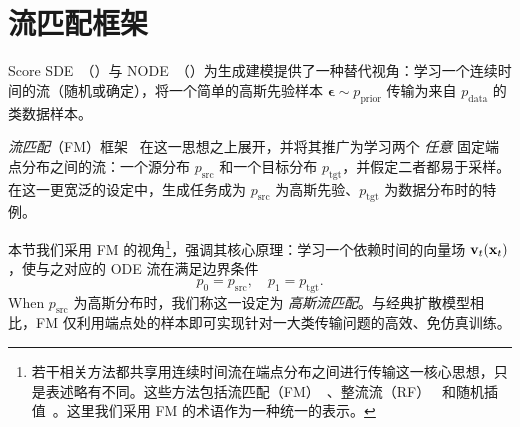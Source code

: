 




\newpage
\clearpage
\section{\texorpdfstring{流匹配框架}{Flow Matching Framework}}\label{sec:flow-matching-framework}

Score SDE~（）与 NODE~（）为生成建模提供了一种替代视角：学习一个连续时间的流（随机或确定），将一个简单的高斯先验样本 $\bm{\epsilon} \sim p_{\text{prior}}$ 传输为来自 $p_{\text{data}}$ 的类数据样本。

\emph{流匹配}（FM）框架~\citep{lipman2022flow,lipman2024flow,tongimproving} 在这一思想之上展开，并将其推广为学习两个 \emph{任意} 固定端点分布之间的流：一个源分布 $p_{\text{src}}$ 和一个目标分布 $p_{\text{tgt}}$，并假定二者都易于采样。在这一更宽泛的设定中，生成任务成为 $p_{\text{src}}$ 为高斯先验、$p_{\text{tgt}}$ 为数据分布时的特例。

本节我们采用 FM 的视角\footnote{若干相关方法都共享用连续时间流在端点分布之间进行传输这一核心思想，只是表述略有不同。这些方法包括流匹配（FM）~\citep{lipman2022flow,neklyudov2023action}、整流流（RF）~\citep{liu2022rectified,heitz2023iterative} 和随机插值~\citep{albergo2023stochastic,albergobuilding,ma2024sit}。这里我们采用 FM 的术语作为一种统一的表示。}，强调其核心原理：学习一个依赖时间的向量场 $\mathbf{v}_t({\mathbf{x}}_t)$，使与之对应的 ODE 流在满足边界条件
\[
p_0 = p_{\text{src}}, \quad p_1 = p_{\text{tgt}}.
\]
When $p_{\text{src}}$ 为高斯分布时，我们称这一设定为 \emph{高斯流匹配}。与经典扩散模型相比，FM 仅利用端点处的样本即可实现针对一大类传输问题的高效、免仿真训练。






